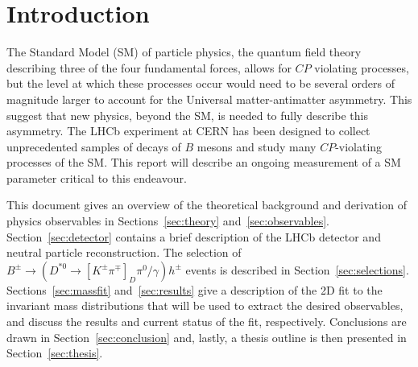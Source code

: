 \documentclass[oneside,12pt]{article}
\begin{document}
\section{\normalsize Introduction}
The Standard Model (SM) of particle physics, the quantum field theory describing
three of the four fundamental forces, allows for $CP$ violating processes, but the
level at which these processes occur would need to be several orders of
magnitude larger to account for the Universal matter-antimatter asymmetry. This
suggest that new physics, beyond the SM, is needed to fully describe this
asymmetry. The LHCb experiment at CERN has been designed to collect
unprecedented samples of decays of $B$ mesons and study many $CP$-violating
processes of the SM. This report will describe an ongoing measurement of a SM
parameter critical to this endeavour.

This document gives an overview of the theoretical background and derivation of
physics observables in Sections~\ref{sec:theory} and~\ref{sec:observables}.
Section~\ref{sec:detector} contains a brief description of the LHCb detector and
neutral particle reconstruction. The selection of $B^{\pm}\rightarrow
(D^{*0}\rightarrow [K^{\pm}\pi^{\mp}]_D\pi^0/\gamma)h^{\pm}$ events is
described in Section~\ref{sec:selections}. Sections~\ref{sec:massfit}
and~\ref{sec:results} give a description of the 2D fit to the invariant mass
distributions that will be used to extract the desired observables, and discuss the
results and current status of the fit, respectively. Conclusions are drawn in
Section~\ref{sec:conclusion} and, lastly, a thesis outline is then presented in
Section~\ref{sec:thesis}. 
\end{document}
